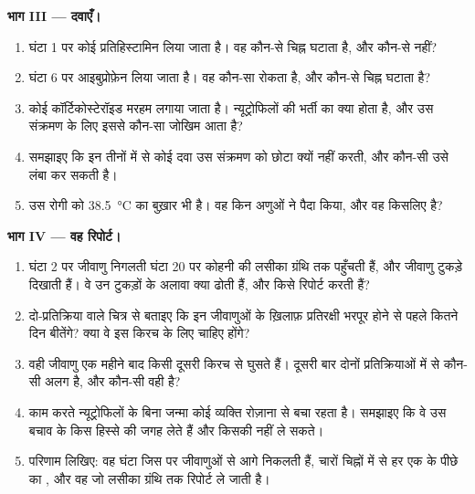\begin{problem}
\medskip
\noindent\textbf{भाग III --- दवाएँ।}
\begin{enumerate}[resume]
  \item घंटा 1 पर कोई प्रतिहिस्टामिन लिया जाता है। वह कौन-से चिह्न घटाता
        है, और कौन-से नहीं?
  \item घंटा 6 पर आइबुप्रोफ़ेन लिया जाता है। वह कौन-सा  रोकता है,
        और कौन-से चिह्न घटाता है?
  \item कोई कॉर्टिकोस्टेरॉइड मरहम लगाया जाता है। न्यूट्रोफिलों की भर्ती का
        क्या होता है, और उस संक्रमण के लिए इससे कौन-सा जोखिम आता है?
  \item समझाइए कि इन तीनों में से कोई दवा उस संक्रमण को छोटा क्यों नहीं
        करती, और कौन-सी उसे लंबा कर सकती है।
  \item उस रोगी को \qty{38.5}{\celsius} का बुख़ार भी है। वह किन अणुओं ने
        पैदा किया, और वह किसलिए है?
\end{enumerate}

\medskip
\noindent\textbf{भाग IV --- वह रिपोर्ट।}
\begin{enumerate}[resume]
  \item घंटा 2 पर जीवाणु निगलती  घंटा 20 पर कोहनी की लसीका
        ग्रंथि तक पहुँचती हैं, और जीवाणु टुकड़े दिखाती हैं। वे उन टुकड़ों
        के अलावा क्या ढोती हैं, और किसे रिपोर्ट करती हैं?
  \item दो-प्रतिक्रिया वाले चित्र से बताइए कि इन जीवाणुओं के ख़िलाफ़
        प्रतिरक्षी भरपूर होने से पहले कितने दिन बीतेंगे? क्या वे इस किरच के
        लिए चाहिए होंगे?
  \item वही जीवाणु एक महीने बाद किसी दूसरी किरच से घुसते हैं। दूसरी बार
        दोनों प्रतिक्रियाओं में से कौन-सी अलग है, और कौन-सी वही है?
  \item काम करते न्यूट्रोफिलों के बिना जन्मा कोई व्यक्ति रोज़ाना
         से बचा रहता है। समझाइए कि वे  उस बचाव के
        किस हिस्से की जगह लेते हैं और किसकी नहीं ले सकते।
  \item परिणाम लिखिए: वह घंटा जिस पर  जीवाणुओं से आगे निकलती
        हैं, चारों चिह्नों में से हर एक के पीछे का , और वह  जो
        लसीका ग्रंथि तक रिपोर्ट ले जाती है।
\end{enumerate}
\end{problem}
